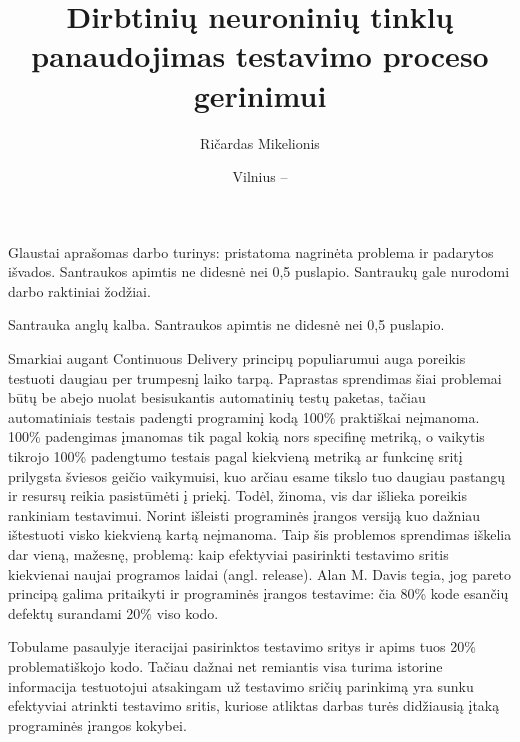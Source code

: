 \documentclass{VUMIFPSbakalaurinis}
\title{Dirbtinių neuroninių tinklų panaudojimas testavimo proceso gerinimui}
\author{Ričardas Mikelionis}
\date{Vilnius – \the\year}
\begin{document}
\maketitle


Glaustai aprašomas darbo turinys: pristatoma nagrinėta problema ir padarytos
išvados. Santraukos apimtis ne didesnė nei 0,5 puslapio. Santraukų gale
nurodomi darbo raktiniai žodžiai. 

Santrauka anglų kalba. Santraukos apimtis ne didesnė nei 0,5 puslapio.

\tableofcontents

Smarkiai augant Continuous Delivery principų populiarumui auga poreikis testuoti daugiau per trumpesnį laiko tarpą. Paprastas sprendimas šiai problemai būtų be abejo nuolat besisukantis automatinių testų paketas, tačiau automatiniais testais padengti programinį kodą 100\% praktiškai neįmanoma. 100\% padengimas įmanomas tik pagal kokią nors specifinę metriką, o vaikytis tikrojo 100\% padengtumo testais pagal kiekvieną metriką ar funkcinę sritį prilygsta šviesos geičio vaikymuisi, kuo arčiau esame tikslo tuo daugiau pastangų ir resursų reikia pasistūmėti į priekį. Todėl, žinoma, vis dar išlieka poreikis rankiniam testavimui. Norint išleisti programinės įrangos versiją kuo dažniau ištestuoti visko kiekvieną kartą neįmanoma. Taip šis problemos sprendimas iškelia dar vieną, mažesnę, problemą: kaip efektyviai pasirinkti testavimo sritis kiekvienai naujai programos laidai (angl. release). Alan M. Davis \cite{Davis:1995:PSD:203406} tegia, jog pareto principą galima pritaikyti ir programinės įrangos testavime: čia 80\% kode esančių defektų surandami 20\% viso kodo.

Tobulame pasaulyje iteracijai pasirinktos testavimo sritys ir apims tuos 20\% problematiškojo kodo. Tačiau dažnai net remiantis visa turima istorine informacija testuotojui atsakingam už testavimo sričių parinkimą yra sunku efektyviai atrinkti testavimo sritis, kuriose atliktas darbas turės didžiausią įtaką programinės įrangos kokybei.
\end{document}
